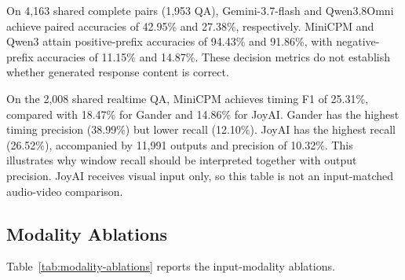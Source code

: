 On 4,163 shared complete pairs (1,953 QA), Gemini-3.7-flash and Qwen3.8Omni achieve paired accuracies of 42.95\% and 27.38\%, respectively. MiniCPM and Qwen3 attain positive-prefix accuracies of 94.43\% and 91.86\%, with negative-prefix accuracies of 11.15\% and 14.87\%. These decision metrics do not establish whether generated response content is correct.

On the 2,008 shared realtime QA, MiniCPM achieves timing F1 of 25.31\%, compared with 18.47\% for Gander and 14.86\% for JoyAI. Gander has the highest timing precision (38.99\%) but lower recall (12.10\%). JoyAI has the highest recall (26.52\%), accompanied by 11,991 outputs and precision of 10.32\%. This illustrates why window recall should be interpreted together with output precision. JoyAI receives visual input only, so this table is not an input-matched audio-video comparison.

\subsection{Modality Ablations}

Table~\ref{tab:modality-ablations} reports the input-modality ablations.

